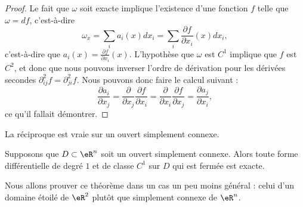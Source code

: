 \begin{proof}
	Le fait que \( \omega\) soit exacte implique l'existence d'une fonction \( f\) telle que \( \omega=df\), c'est-à-dire
	\begin{equation}
		\omega_x=\sum_i a_i(x)dx_i=\sum_i\frac{ \partial f }{ \partial x_i }(x)dx_i,
	\end{equation}
	c'est-à-dire que \( a_i(x)=\frac{ \partial f }{ \partial x_i }(x)\). L'hypothèse que \( \omega\) est \( C^1\) implique que \( f\) est \( C^2\), et donc que nous pouvons inverser l'ordre de dérivation pour les dérivées secondes \( \partial^2_{ij}f=\partial^2_{ji}f\). Nous pouvons donc faire le calcul suivant :
	\begin{equation}
		\frac{ \partial a_i }{ \partial x_j }=\frac{ \partial  }{ \partial x_j }\frac{ \partial f }{ \partial x_i }=\frac{ \partial  }{ \partial x_i }\frac{ \partial f }{ \partial x_j }=\frac{ \partial a_j }{ \partial x_i },
	\end{equation}
	ce qu'il fallait démontrer.
\end{proof}

La réciproque est vraie sur un ouvert simplement connexe.
\begin{theorem}        \label{ThoFermeExactFormRappel}
	Supposons que \( D\subset\eR^n\) soit un ouvert simplement connexe. Alors toute forme différentielle de degré \( 1\) et de classe \( C^1\) sur \( D\) qui est fermée est exacte.
\end{theorem}

Nous allons prouver ce théorème dans un cas un peu moins général : celui d'un domaine étoilé de \( \eR^2\) plutôt que simplement connexe de \( \eR^n\).

